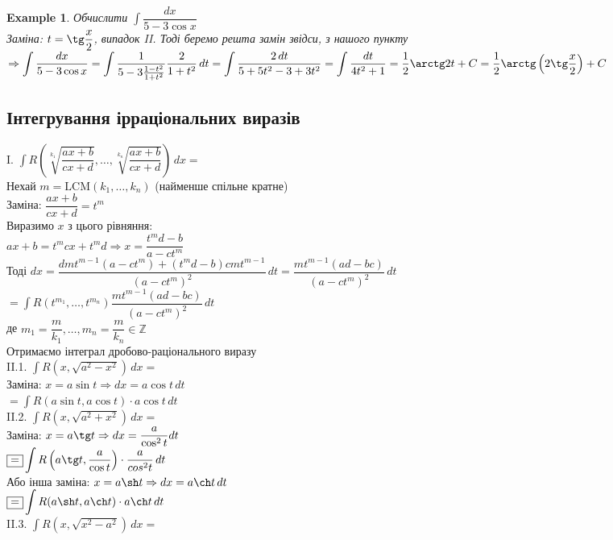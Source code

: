 \documentclass[a4paper, 14pt]{extarticle}
\def\huge{\displaystyle}
\def\bigline{\vspace{5mm}\\}
\theoremstyle{theoremdd}
\theoremstyle{theoremdd}
\theoremstyle{theoremdd}
\theoremstyle{theoremdd}
\newtheorem{example}[theorem]{Example}
\theoremstyle{theoremdd}
\theoremstyle{theoremdd}
\theoremstyle{theoremdd}
\theoremstyle{theoremdd}
\begin{document}
\begin{example}
Обчислити $\huge \int \dfrac{dx}{5-3\cos x}$\\
Заміна: $t = \tg \dfrac{x}{2}$, випадок II.
Тоді беремо решта замін звідси, з нашого пункту\\
$\Rightarrow \huge \int \dfrac{dx}{5-3\cos x} = \int \dfrac{1}{5-3 \frac{1-t^2}{1+t^2}} \dfrac{2}{1+t^2}\,dt = \int \dfrac{2\,dt}{5+5t^2-3+3t^2} = \int \dfrac{dt}{4t^2+1} = \dfrac{1}{2} \arctg 2t + C = \dfrac{1}{2} \arctg \left(2 \tg \dfrac{x}{2} \right) + C$
\end{example}
\medskip

\subsection{Інтегрування ірраціональних виразів}
I. $\huge \int R\left( \sqrt[k_1]{\dfrac{ax+b}{cx+d}}, \dots, \sqrt[k_n]{\dfrac{ax+b}{cx+d}} \right)\,dx \boxed{=}$\\
Нехай $m = \textrm{LCM} (k_1,\dots,k_n)$ (найменше спільне кратне)\\
Заміна: $\dfrac{ax+b}{cx+d} = t^m$\\
Виразимо $x$ з цього рівняння:\\
$ax+b =t^m cx + t^m d \Rightarrow x = \dfrac{t^md-b}{a-ct^m}$\\
Тоді $dx = \dfrac{dmt^{m-1}(a-ct^m) + (t^md-b)cmt^{m-1}}{(a-ct^m)^2}\,dt = \dfrac{mt^{m-1}(ad-bc)}{(a-ct^m)^2}\,dt$\\
$\huge \boxed{=} \int R(t^{m_1},\dots,t^{m_n}) \dfrac{mt^{m-1}(ad-bc)}{(a-ct^m)^2}\,dt$\\
де $m_1 = \dfrac{m}{k_1},\dots,m_n = \dfrac{m}{k_n} \in \mathbb{Z}$\\
Отримаємо інтеграл дробово-раціонального виразу
\bigline
II.1. $\huge \int R(x,\sqrt{a^2-x^2})\,dx \boxed{=}$\\
Заміна: $x = a\sin t \Rightarrow dx = a\cos t \,dt$\\
$\boxed{=} \huge \int R(a\sin t, a\cos t) \cdot a\cos t \,dt$
\bigline
II.2. $\huge \int R(x,\sqrt{a^2+x^2})\,dx \boxed{=}$\\
Заміна: $x = a\tg t \Rightarrow dx = \dfrac{a}{\cos^2 t} dt$\\
$\boxed{=} \huge \int R\left(a\tg t, \dfrac{a}{\cos t}\right) \cdot \dfrac{a}{cos^2 t} \,dt$
\bigline
Або інша заміна: $x = a \sh t \Rightarrow dx = a \ch t \,dt$\\
$\boxed{=} \huge \int R(a\sh t, a \ch t) \cdot a \ch t\,dt$
\bigline
II.3. $\huge \int R(x, \sqrt{x^2-a^2})\,dx \boxed{=}$\\
\end{document}
